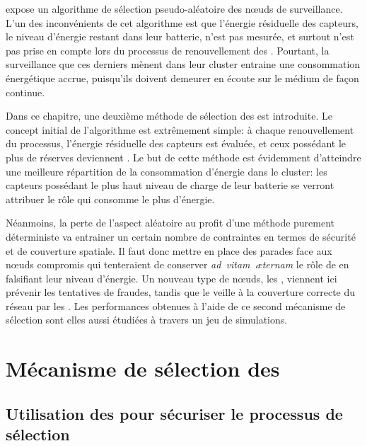
 expose un algorithme de sélection pseudo-aléatoire des nœuds de surveillance.
L'un des inconvénients de cet algorithme est que l'énergie résiduelle des capteurs, \cad le niveau d'énergie restant dans leur batterie, n'est pas mesurée, et surtout n'est pas prise en compte lors du processus de renouvellement des \cns.
Pourtant, la surveillance que ces derniers mènent dans leur cluster entraine une consommation énergétique accrue, puisqu'ils doivent demeurer en écoute sur le médium de façon continue.

Dans ce chapitre, une deuxième méthode de sélection des \cns est introduite.
Le concept initial de l'algorithme est extrêmement simple: à chaque renouvellement du processus, l'énergie résiduelle des capteurs est évaluée, et ceux possédant le plus de réserves deviennent \cns.
Le but de cette méthode est évidemment d'atteindre une meilleure répartition de la consommation d'énergie dans le cluster: les capteurs possédant le plus haut niveau de charge de leur batterie se verront attribuer le rôle qui consomme le plus d'énergie.

Néanmoins, la perte de l'aspect aléatoire au profit d'une méthode purement déterministe va entrainer un certain nombre de contraintes en termes de sécurité et de couverture spatiale.
Il faut donc mettre en place des parades face aux nœuds compromis qui tenteraient de conserver \textit{ad~vitam~æternam} le rôle de \cn en falsifiant leur niveau d'énergie.
Un nouveau type de nœuds, les \vns, viennent ici prévenir les tentatives de fraudes, tandis que le \ch veille à la couverture correcte du réseau par les \cns.
Les performances obtenues à l'aide de ce second mécanisme de sélection sont elles aussi étudiées à travers un jeu de simulations.

\section{Mécanisme de sélection des \cns}\label{se:sec:proposal}

    \subsection{Utilisation des \vns pour sécuriser le processus de sélection}\label{se:subsubsec:elec1}

